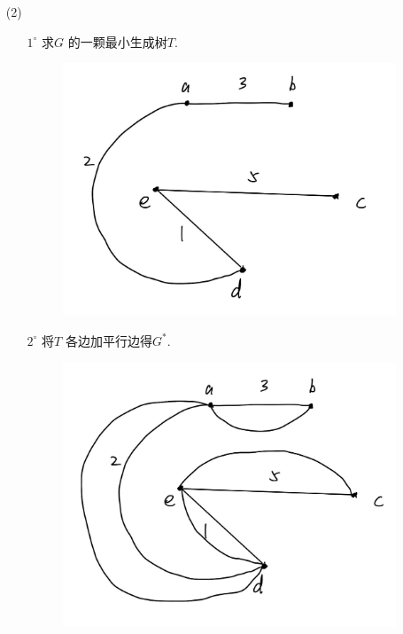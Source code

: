 \documentclass{article}
\begin{document}
\begin{enumerate}
    \item [(2)]
    \begin{enumerate}
        \item [$1^\circ$]求$G$ 的一颗最小生成树$T$.
        \begin{figure}[htbp]
            \centering
            \includegraphics[scale=0.2]{t221.jpg}
        \end{figure}
        \item [$2^\circ$]将$T$ 各边加平行边得$G^*$.
        \begin{figure}[htbp]
            \centering
            \includegraphics[scale=0.2]{t222.jpg}
        \end{figure}

\end{enumerate}
\end{enumerate}
\end{document}
